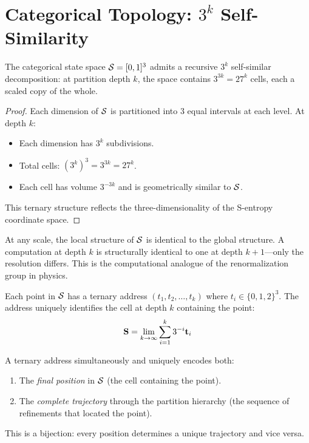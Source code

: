 \section{Categorical Topology: $3^k$ Self-Similarity}
\label{sec:topology}

\begin{theorem}
\label{thm:ternary}
The categorical state space $\mathcal{S} = [0,1]^3$ admits a recursive $3^k$ self-similar decomposition: at partition depth $k$, the space contains $3^{3k} = 27^k$ cells, each a scaled copy of the whole.
\end{theorem}

\begin{proof}
Each dimension of $\mathcal{S}$ is partitioned into 3 equal intervals at each level. At depth $k$:
\begin{itemize}
    \item Each dimension has $3^k$ subdivisions.
    \item Total cells: $(3^k)^3 = 3^{3k} = 27^k$.
    \item Each cell has volume $3^{-3k}$ and is geometrically similar to $\mathcal{S}$.
\end{itemize}
This ternary structure reflects the three-dimensionality of the S-entropy coordinate space.
\end{proof}

\begin{corollary}
At any scale, the local structure of $\mathcal{S}$ is identical to the global structure. A computation at depth $k$ is structurally identical to one at depth $k+1$---only the resolution differs. This is the computational analogue of the renormalization group in physics.
\end{corollary}

\begin{definition}
\label{def:ternary_addr}
Each point in $\mathcal{S}$ has a ternary address $(t_1, t_2, \ldots, t_k)$ where $t_i \in \{0, 1, 2\}^3$. The address uniquely identifies the cell at depth $k$ containing the point:
\begin{equation}
    \mathbf{S} = \lim_{k \to \infty} \sum_{i=1}^{k} 3^{-i} \mathbf{t}_i
\end{equation}
\end{definition}

\begin{theorem}
\label{thm:pos_traj}
A ternary address simultaneously and uniquely encodes both:
\begin{enumerate}
    \item The \emph{final position} in $\mathcal{S}$ (the cell containing the point).
    \item The \emph{complete trajectory} through the partition hierarchy (the sequence of refinements that located the point).
\end{enumerate}
This is a bijection: every position determines a unique trajectory and vice versa.
\end{theorem}

